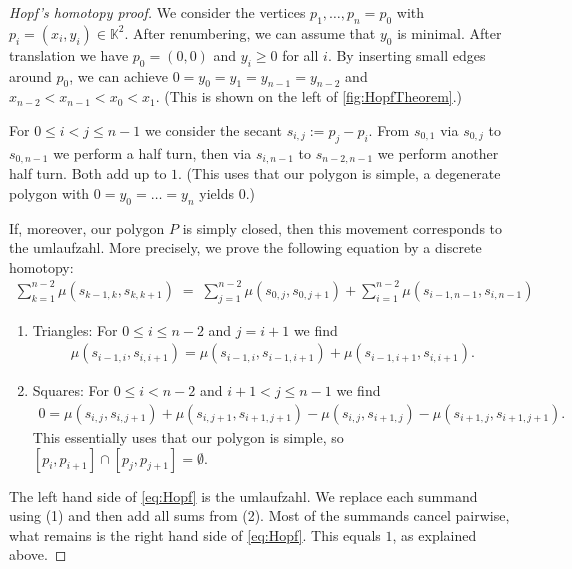 \documentclass[a4paper]{amsart}
\numberwithin{equation}{section}
\theoremstyle{plain}
\theoremstyle{definition}
\newcommand{\K}{\mathbb{K}}
\begin{document}
\begin{proof}[Hopf's homotopy proof]
  We consider the vertices $p_1,\ldots,p_n=p_0$ with $p_i = (x_i,y_i) \in \K^2$.
  After renumbering, we can assume that $y_0$ is minimal.
  After translation we have $p_0 = (0,0)$ and $y_i \ge 0$ for all $i$.
  By inserting small edges around $p_0$,
  we can achieve $0 = y_0 = y_1 = y_{n-1} = y_{n-2}$
  and $x_{n-2} < x_{n-1} < x_0 < x_1$.
  (This is shown on the left of \autoref{fig:HopfTheorem}.)
  
  For $0 \le i < j \le n-1$ we consider the secant $s_{i,j} := p_j - p_i$.
  From $s_{0,1}$ via $s_{0,j}$ to $s_{0,n-1}$ we perform a half turn,
  then via $s_{i,n-1}$ to $s_{n-2,n-1}$ we perform another half turn.
  Both add up to $1$.  (This uses that our polygon is simple,
  a degenerate polygon with $0 = y_0 = \ldots = y_n$ yields $0$.)
  
  If, moreover, our polygon $P$ is simply closed,
  then this movement corresponds to the umlaufzahl.
  More precisely, we prove the following equation by a discrete homotopy:
  \begin{align}
    \label{eq:Hopf}
    \sum_{k=1}^{n-2} \mu( s_{k-1,k}, s_{k,k+1} )
    \;=\;
    \sum_{j=1}^{n-2} \mu( s_{0,j}, s_{0,j+1} ) +
    \sum_{i=1}^{n-2} \mu( s_{i-1,n-1}, s_{i,n-1} )
  \end{align}
  \begin{enumerate}
  \item
    Triangles: For $0 \le i \le n-2$ and $j = i+1$ we find
    \begin{align*}
      \mu( s_{i-1,i}, s_{i,i+1} ) =
      \mu( s_{i-1,i}, s_{i-1,i+1} ) +
      \mu( s_{i-1,i+1}, s_{i,i+1} ) .
    \end{align*}
  \item
    Squares: For $0 \le i < n-2$ and $i+1 < j \le n-1$ we find
    \begin{align*}
      0 = \mu( s_{i,j}, s_{i,j+1} ) + \mu( s_{i,j+1}, s_{i+1,j+1} )
      - \mu( s_{i,j}, s_{i+1,j} ) - \mu( s_{i+1,j}, s_{i+1,j+1} ) .
    \end{align*}
    This essentially uses that our polygon is simple,
    so $[p_i,p_{i+1}] \cap [p_j,p_{j+1}] = \emptyset$.
  \end{enumerate}

  The left hand side of \eqref{eq:Hopf}
  is the umlaufzahl. %
  We replace each summand using (1) and then add all sums from (2).
  Most of the summands cancel pairwise,
  what remains is the right hand side of \eqref{eq:Hopf}.
  This equals $1$, as explained above.
\end{proof}
\end{document}
